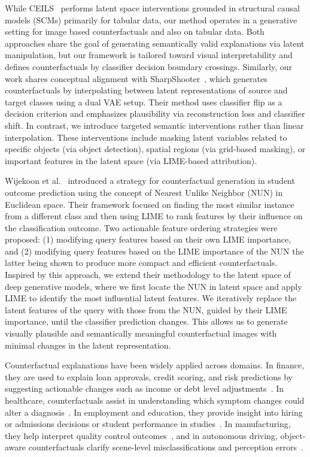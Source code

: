 While CEILS~\cite{crupi2021counterfactualexplanationsinterventionslatent} performs latent space interventions grounded in structural causal models (SCMs) primarily for tabular data, our method operates in a generative setting for image based counterfactuals and also on tabular data. Both approaches share the goal of generating semantically valid explanations via latent manipulation, but our framework is tailored toward visual interpretability and defines counterfactuals by classifier decision boundary crossings. Similarly, our work shares conceptual alignment with SharpShooter~\cite{barr2021counterfactualexplanationslatentspace}, which generates counterfactuals by interpolating between latent representations of source and target classes using a dual VAE setup. Their method uses classifier flip as a decision criterion and emphasizes plausibility via reconstruction loss and classifier shift. In contrast, we introduce targeted semantic interventions rather than linear interpolation. These interventions include masking latent variables related to specific objects (via object detection), spatial regions (via grid-based masking), or important features in the latent space (via LIME-based attribution). 

Wijekoon et al.~\cite{WijekoonWNMPC21} introduced a strategy for counterfactual generation in student outcome prediction using the concept of Nearest Unlike Neighbor (NUN) in Euclidean space. Their framework focused on finding the most similar instance from a different class and then using LIME to rank features by their influence on the classification outcome. Two actionable feature ordering strategies were proposed: (1) modifying query features based on their own LIME importance, and (2) modifying query features based on the LIME importance of the NUN the latter being shown to produce more compact and efficient counterfactuals. Inspired by this approach, we extend their methodology to the latent space of deep generative models, where we first locate the NUN in latent space and apply LIME to identify the most influential latent features. We iteratively replace the latent features of the query with those from the NUN, guided by their LIME importance, until the classifier prediction changes. This allows us to generate visually plausible and semantically meaningful counterfactual images with minimal changes in the latent representation.

Counterfactual explanations have been widely applied across domains. In finance, they are used to explain loan approvals, credit scoring, and risk predictions by suggesting actionable changes such as income or debt level adjustments~\cite{guidotti2022counterfactual, DELANEY2023103995, Rudin2019}. In healthcare, counterfactuals assist in understanding which symptom changes could alter a diagnosis~\cite{10.1145/3351095.3372855}. In employment and education, they provide insight into hiring or admissions decisions or student performance in studies~\cite{WijekoonWNMPC21}. In manufacturing, they help interpret quality control outcomes~\cite{icpram24}, and in autonomous driving, object-aware counterfactuals clarify scene-level misclassifications and perception errors~\cite{zemni2023octetobjectawarecounterfactualexplanations}.


